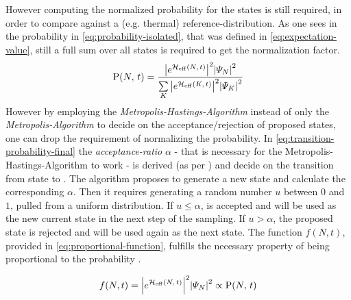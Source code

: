 However computing the normalized probability for the states is still required, in order to compare against a (e.g. thermal) reference-distribution.
As one sees in the probability in \autoref{eq:probability-isolated}, that was defined in \autoref{eq:expectation-value}, still a full sum over all states is required to get the normalization factor.
\begin{equation}
    \label{eq:probability-isolated}
    \probabilityOf{N}{t} = \frac{
        \absSquare{e^{\HeffOft}} \absSquare{\psiN} 
    }{
        \lsum[K] \absSquare{e^{\HeffOft[K]}} \absSquare{\psiN[K]} 
    }
\end{equation}
However by employing the \emph{Metropolis-Hastings-Algorithm} instead of only the \emph{Metropolis-Algorithm} to decide on the acceptance/rejection of proposed states, one can drop the requirement of normalizing the probability.
In \autoref{eq:transition-probability-final} the \emph{acceptance-ratio} $\alpha$ - that is necessary for the Metropolis-Hastings-Algorithm to work - is derived (as per \cite{metropolisHastingsAlgorithmGeneral}) and decide on the transition from state \ketN[N] to .
The algorithm proposes to generate a new state  and calculate the corresponding $\alpha$. Then it requires generating a random number $u$ between $0$ and $1$, pulled from a uniform distribution.
If $u \leq \alpha$,  is accepted and will be used as the new current state in the next step of the sampling. 
If $u>\alpha$, the proposed state is rejected and \ketN[N] will be used again as the next state.
The function $f(N,t)$, provided in \autoref{eq:proportional-function}, fulfills the necessary property of being proportional to the probability  .

\begin{equation}
    \label{eq:proportional-function}
    f(N,t) = \absSquare{e^{\HeffOft}} \absSquare{\psiN} \propto \probabilityOf{N}{t}
\end{equation}


